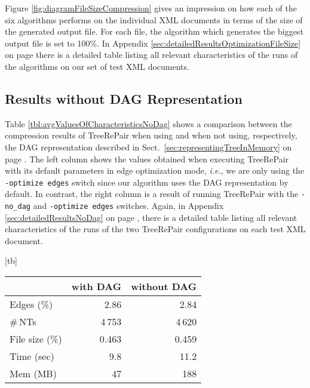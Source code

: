 \documentclass[12pt]{llncs}
\makeatletter
\renewenvironment{table}
               {\setlength\abovecaptionskip{10\p@}\setlength\belowcaptionskip{10\p@}\@float{table}}
               {\end@float}
\newcommand{\trp}{\mbox{TreeRePair}\xspace}
\newcommand{\hairsp}{\hspace{1pt}}\newcommand{\TODO}{\textcolor{red}{\bf TODO!}\xspace}
\newcommand{\ie}{\mbox{\textit{i.\hairsp{}e.}}\xspace}
\makeatother
\begin{document}
Figure \ref{fig:diagramFileSizeCompression} gives an impression on how each of the six algorithms performs on the individual XML documents in terms of the size of the generated output file. For each file, the algorithm which generates the biggest output file is set to 100\%. In Appendix \ref{sec:detailedResultsOptimizationFileSize} on page \pageref{sec:detailedResultsOptimizationFileSize} there is a detailed table listing all relevant characteristics of the runs of the algorithms on our set of test XML documents.

\begin{figure}[p]
\end{figure}

\subsection{Results without DAG Representation}\label{sec:resultsWithoutDag}

Table \ref{tbl:avgValuesOfCharacteristicsNoDag} shows a comparison between the compression results of \trp when using and when not using, respectively, the DAG representation described in Sect.~\ref{sec:representingTreeInMemory} on page \pageref{sec:representingTreeInMemory}. The left column shows the values obtained when executing \trp with its default parameters in edge optimization mode, \ie, we are only using the \texttt{-optimize edges} switch since our algorithm uses the DAG representation by default. In contrast, the right column is a result of running \trp with the \texttt{-no\_dag} and \texttt{-optimize edges} switches.  Again, in Appendix \ref{sec:detailedResultsNoDag} on page \pageref{sec:detailedResultsNoDag}, there is a detailed table listing all relevant characteristics of the runs of the two \trp configurations on each test XML document.

\begin{table}[tb]
	\centering\small
	\begin{tabular}{lrr}
		\toprule
		&with DAG&without DAG\\
		\midrule
		Edges (\%)&2.86&2.84\\
		\#\,NTs&4\,753&4\,620\\
		File size (\%)&0.463&0.459\\
		Time (sec)&9.8&11.2\\
		Mem (MB)&47&188\\
		\bottomrule
	\end{tabular}
	\caption{Average values of the characteristics of the runs of \trp with and without the DAG representation of the input tree.}\label{tbl:avgValuesOfCharacteristicsNoDag}
\end{table}
\end{document}
